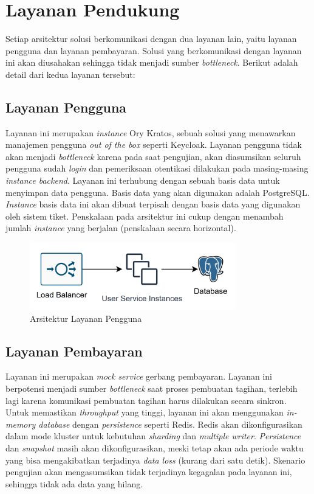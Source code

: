 \section{Layanan Pendukung}

Setiap arsitektur solusi berkomunikasi dengan dua layanan lain, yaitu layanan pengguna dan layanan pembayaran. Solusi yang berkomunikasi dengan layanan ini akan diusahakan sehingga tidak menjadi sumber \textit{bottleneck}. Berikut adalah detail dari kedua layanan tersebut:

\subsection{Layanan Pengguna}

Layanan ini merupakan \textit{instance} Ory Kratos, sebuah solusi yang menawarkan manajemen pengguna \textit{out of the box} seperti Keycloak. Layanan pengguna tidak akan menjadi \textit{bottleneck} karena pada saat pengujian, akan diasumsikan seluruh pengguna sudah \textit{login} dan pemeriksaan otentikasi dilakukan pada masing-masing \textit{instance backend}. Layanan ini terhubung dengan sebuah basis data untuk menyimpan data pengguna. Basis data yang akan digunakan adalah PostgreSQL. \textit{Instance} basis data ini akan dibuat terpisah dengan basis data yang digunakan oleh sistem tiket. Penskalaan pada arsitektur ini cukup dengan menambah jumlah \textit{instance} yang berjalan (penskalaan secara horizontal).

\begin{figure}[htbp]
    \centering
    \includegraphics[width=0.8\textwidth]{resources/appendix/user-service.png}
    \caption{Arsitektur Layanan Pengguna}
    \label{fig:user-service-deployment}
\end{figure}

\subsection{Layanan Pembayaran}

Layanan ini merupakan \textit{mock service} gerbang pembayaran. Layanan ini berpotensi menjadi sumber \textit{bottleneck} saat proses pembuatan tagihan, terlebih lagi karena komunikasi pembuatan tagihan harus dilakukan secara sinkron. Untuk memastikan \textit{throughput} yang tinggi, layanan ini akan menggunakan \textit{in-memory database} dengan \textit{persistence} seperti Redis. Redis akan dikonfigurasikan dalam mode kluster untuk kebutuhan \textit{sharding} dan \textit{multiple writer}. \textit{Persistence} dan \textit{snapshot} masih akan dikonfigurasikan, meski tetap akan ada periode waktu yang bisa mengakibatkan terjadinya \textit{data loss} (kurang dari satu detik). Skenario pengujian akan mengasumsikan tidak terjadinya kegagalan pada layanan ini, sehingga tidak ada data yang hilang.

